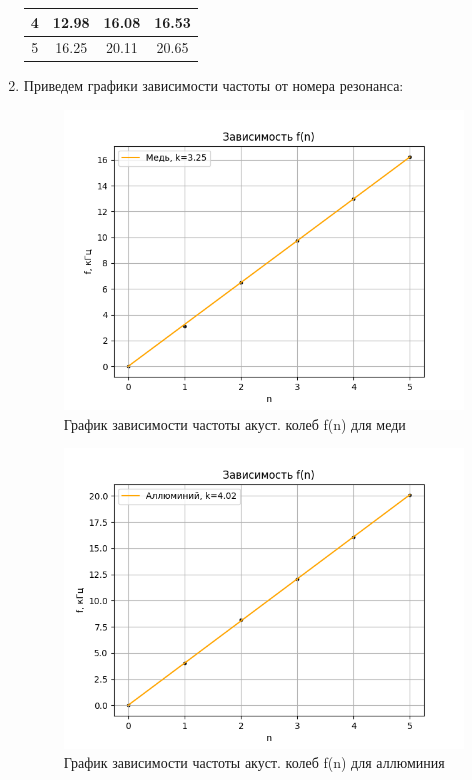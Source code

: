 \documentclass[a4paper, 10pt, twocolumn]{article}
\begin{document}
\begin{enumerate}
\begin{table}[h]
\begin{tabular}{|c|| c|c|c|}
        4 & 12.98 & 16.08 & 16.53 \\ \hline
        5 & 16.25 & 20.11 & 20.65 \\ \hline
        \end{tabular}
    \end{table}
    \item Приведем графики зависимости частоты от номера резонанса: \\
    \begin{figure}[H]
        \centering
        \includegraphics[width=1\linewidth]{graphs/figure1.png}
        \caption{График зависимости частоты акуст. колеб f(n) для меди}
    \end{figure}

    \begin{figure}[H]
        \centering
        \includegraphics[width=1\linewidth]{graphs/figure2.png}
        \caption{График зависимости частоты акуст. колеб f(n) для аллюминия}
    \end{figure}


\end{enumerate}
\end{document}
